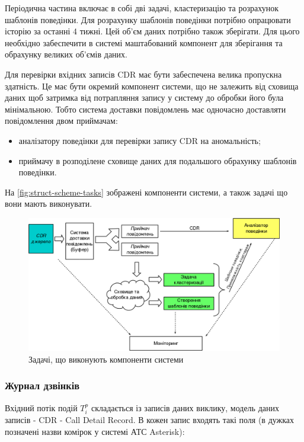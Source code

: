 Періодична частина включає в собі дві задачі, кластеризацію та розрахунок шаблонів поведінки. Для розрахунку шаблонів поведінки потрібно опрацювати історію за останні 4 тижні. Цей об'єм даних потрібно також зберігати. Для цього необхідно забеспечити в системі маштабований компонент для зберігання та обрахунку великих об'ємів даних.

Для перевірки вхідних записів CDR має бути забеспечена велика пропускна здатність. Це має бути окремий компонент системи, що не залежить від сховища даних щоб затримка від потрапляння запису у систему до обробки його була мінімальною. Тобто система доставки повідомлень має одночасно доставляти повідомлення двом приймачам:

\begin{itemize}
\item аналізатору поведінки для перевірки запису CDR на аномальність;
\item приймачу в розподілене сховище даних для подальшого обрахунку шаблонів поведінки.
\end{itemize}

На \autoref{fig:struct-scheme-tasks} зображені компоненти системи, а також задачі що вони мають виконувати.

\begin{figure}[h]
        \begin{center}
            \includegraphics[scale=0.6]{resources/struct-2.png}
        \end{center}
        \caption{Задачі, що виконують компоненти системи}
        \label{fig:struct-scheme-tasks}
\end{figure}

\subsubsection{Журнал дзвінків}
  Вхідний потік подій ${T_i^p}$ складається із записів даних виклику, модель 
  даних записів - CDR - Call Detail Record. В кожен запис входять такі поля (в 
  дужках позначені назви комірок у системі АТС Asterisk):

